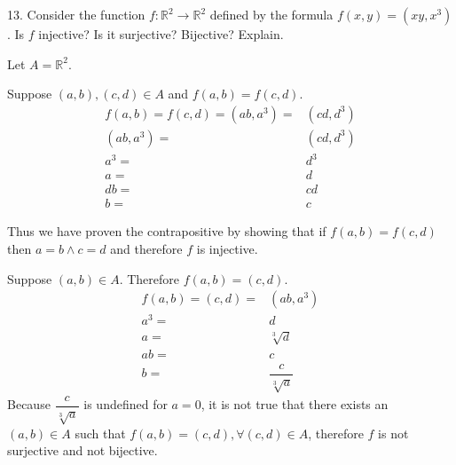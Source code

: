 \documentclass{article}
\begin{document}
\begin{exercise}{}{}
	{13. Consider the function $f: \mathbb{R}^2 \rightarrow
			\mathbb{R}^2$ defined by the formula $f(x, y)=\left(x y, x^3\right)$. Is $f$
		injective? Is it surjective? Bijective? Explain.}
	\begin{alist}
		\item Let $A=\mathbb{R}^2$.
		\item Suppose $(a, b), (c, d) \in A$ and $f(a, b)=f(c, d)$.
		\begin{align*}
			f(a, b)=f(c, d)=(ab, a^3) = & (cd, d^3) \\
			(ab, a^3) =                 & (cd, d^3) \\
			a^3=                        & d^3       \\
			a=                          & d         \\
			db=                         & cd        \\
			b=                          & c
		\end{align*}
		\item Thus we have proven the contrapositive by showing that if $f(a, b)=f(c,
			d)$ then $a=b \land c=d$ and therefore $f$ is injective.
		\item Suppose $(a, b)\in A$. Therefore $f(a, b)=(c, d)$.
		\begin{align*}
			f(a, b)=(c,d)= & (ab, a^3)              \\
			a^3=           & d                      \\
			a=             & \sqrt[3]{d}            \\
			ab=            & c                      \\
			b=             & \dfrac{c}{\sqrt[3]{a}}
		\end{align*}
		Because $\dfrac{c}{\sqrt[3]{a}}$ is undefined for $a=0$, it is not true that
		there exists an $(a, b)\in A$ such that $f(a, b)=(c, d), \forall (c, d) \in A$,
		therefore $f$ is not surjective and not bijective.
	\end{alist}
\end{exercise}{}{}
\end{document}
